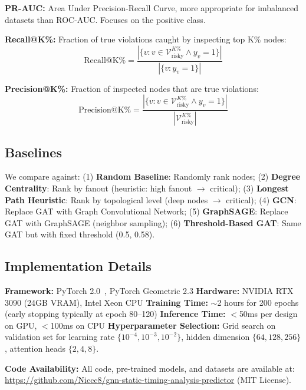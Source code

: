 \textbf{PR-AUC:} Area Under Precision-Recall Curve, more appropriate for imbalanced datasets than ROC-AUC. Focuses on the positive class.

\textbf{Recall@K\%:} Fraction of true violations caught by inspecting top K\% nodes:
\begin{equation}
\text{Recall@K\%} = \frac{|\{v : v \in \mathcal{V}_{\text{risky}}^{K\%} \wedge y_v = 1\}|}{|\{v : y_v = 1\}|}
\label{eq:recall_k}
\end{equation}

\textbf{Precision@K\%:} Fraction of inspected nodes that are true violations:
\begin{equation}
\text{Precision@K\%} = \frac{|\{v : v \in \mathcal{V}_{\text{risky}}^{K\%} \wedge y_v = 1\}|}{|\mathcal{V}_{\text{risky}}^{K\%}|}
\label{eq:prec_k}
\end{equation}

\subsection{Baselines}

We compare against:
(1) \textbf{Random Baseline}: Randomly rank nodes;
(2) \textbf{Degree Centrality}: Rank by fanout (heuristic: high fanout $\rightarrow$ critical);
(3) \textbf{Longest Path Heuristic}: Rank by topological level (deep nodes $\rightarrow$ critical);
(4) \textbf{GCN}: Replace GAT with Graph Convolutional Network;
(5) \textbf{GraphSAGE}: Replace GAT with GraphSAGE (neighbor sampling);
(6) \textbf{Threshold-Based GAT}: Same GAT but with fixed threshold (0.5, 0.58).

\subsection{Implementation Details}

\textbf{Framework:} PyTorch 2.0~\cite{pytorch_geometric}, PyTorch Geometric 2.3  
\textbf{Hardware:} NVIDIA RTX 3090 (24GB VRAM), Intel Xeon CPU  
\textbf{Training Time:} $\sim$2 hours for 200 epochs (early stopping typically at epoch 80--120)  
\textbf{Inference Time:} $<$50ms per design on GPU, $<$100ms on CPU  
\textbf{Hyperparameter Selection:} Grid search on validation set for learning rate $\{10^{-4}, 10^{-3}, 10^{-2}\}$, hidden dimension $\{64, 128, 256\}$, attention heads $\{2, 4, 8\}$.

\textbf{Code Availability:} All code, pre-trained models, and datasets are available at: \url{https://github.com/Niccc8/gnn-static-timing-analysis-predictor} (MIT License).

